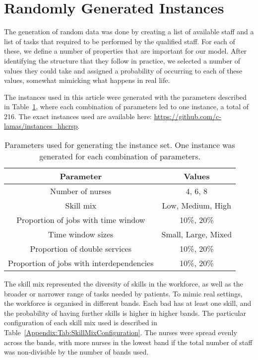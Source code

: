 \section{Randomly Generated Instances}\label{appendix:RandomlyGeneratedData}

The generation of random data was done by creating a list of available staff and a list of tasks that required to be performed by the qualified staff. 
For each of these, we define a number of properties that are important for our model. After identifying the structure that they follow in practice, we selected a number of values they could take and assigned a probability of occurring to each of these values, somewhat mimicking what happens in real life.

The instances used in this article were generated with the parameters described in Table~\ref{Appendix:Tab:InstanceDescription}, where each combination of parameters led to one instance, a total of 216. The exact instances used are available here: \url{https://github.com/c-lamas/instances_hhcrsp}.

\begin{table}[htbp!]
	\caption{Parameters used for generating the instance set. One instance was generated for each combination of parameters.}
	\centering
	\begin{tabular}{|c|c|}
		\hline
		\textbf{Parameter} & \textbf{Values} \\ \hline
		Number of nurses   &  4, 6, 8\\ \hline
		Skill mix   &  Low, Medium, High				   \\ \hline
		Proportion of jobs with time window & 10\%, 20\%\\ \hline
		Time window sizes & Small, Large, Mixed \\ \hline
		Proportion of double services & 10\%, 20\%\\ \hline
		Proportion of jobs with interdependencies & 10\%, 20\%\\ \hline
	\end{tabular}\label{Appendix:Tab:InstanceDescription}
\end{table}

The skill mix represented the diversity of skills in the workforce, as well as the broader or narrower range of tasks needed by patients. To mimic real settings, the workforce is organised in different bands. Each bad has at least one skill, and the probability of having further skills is higher in higher bands. The particular configuration of each skill mix used is described in Table~\ref{Appendix:Tab:SkillMixConfiguration}. The nurses were spread evenly across the bands, with more nurses in the lowest band if the total number of staff was non-divisible by the number of bands used.

